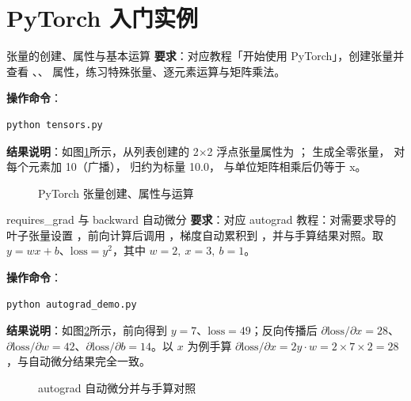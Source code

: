 \section{PyTorch 入门实例}

\begin{exercise}{张量的创建、属性与基本运算}
\textbf{要求}：对应教程「开始使用 PyTorch」，创建张量并查看 、、 属性，练习特殊张量、逐元素运算与矩阵乘法。

\textbf{操作命令}：
\begin{lstlisting}
python tensors.py
\end{lstlisting}

\textbf{结果说明}：如图\ref{fig:ms2-08}所示，从列表创建的 2$\times$2 浮点张量属性为 ； 生成全零张量， 对每个元素加 10（广播）， 归约为标量 10.0， 与单位矩阵相乘后仍等于 x。

\begin{figure}[H]
    \centering
    \caption{PyTorch 张量创建、属性与运算}
    \label{fig:ms2-08}
\end{figure}
\end{exercise}

\begin{exercise}{requires\_grad 与 backward 自动微分}
\textbf{要求}：对应 autograd 教程：对需要求导的叶子张量设置 ，前向计算后调用 ，梯度自动累积到 ，并与手算结果对照。取 $y=wx+b$、$\mathrm{loss}=y^2$，其中 $w=2,\ x=3,\ b=1$。

\textbf{操作命令}：
\begin{lstlisting}
python autograd_demo.py
\end{lstlisting}

\textbf{结果说明}：如图\ref{fig:ms2-09}所示，前向得到 $y=7$、$\mathrm{loss}=49$；反向传播后 $\partial\mathrm{loss}/\partial x=28$、$\partial\mathrm{loss}/\partial w=42$、$\partial\mathrm{loss}/\partial b=14$。以 $x$ 为例手算 $\partial\mathrm{loss}/\partial x=2y\cdot w=2\times7\times2=28$，与自动微分结果完全一致。

\begin{figure}[H]
    \centering
    \caption{autograd 自动微分并与手算对照}
    \label{fig:ms2-09}
\end{figure}
\end{exercise}

